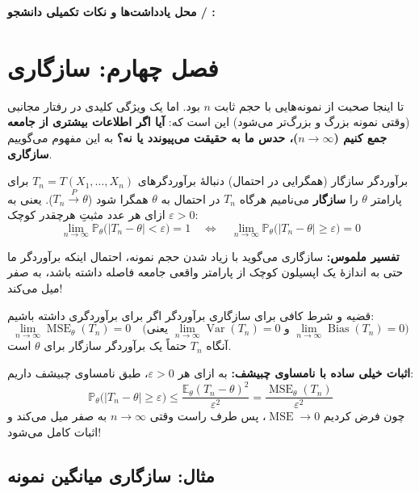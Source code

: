 \documentclass[12pt,a4paper,oneside]{report}
\newcommand{\notespace}{%
  \par\vspace{8pt}%
  \begin{tcolorbox}[breakable=false,colback=white,colframe=muted!50,boxrule=.6pt,arc=1.5mm,height=0.36\textheight]
    \textcolor{muted!70}{\small\textbf{محل یادداشت‌ها و نکات تکمیلی دانشجو / \lr{TA}:}}
  \end{tcolorbox}%
  \par\vspace{8pt}%
}
\newcommand{\E}{\mathbb E}
\newcommand{\Var}{\operatorname{Var}}
\newcommand{\MSE}{\operatorname{MSE}}
\newcommand{\Bias}{\operatorname{Bias}}
\newcommand{\Prob}{\mathbb P}
\begin{document}
\notespace

\clearpage
\chapter*{فصل چهارم: سازگاری }

تا اینجا صحبت از نمونه‌هایی با حجم ثابت $n$ بود. اما یک ویژگی کلیدی در رفتار مجانبی (وقتی نمونه بزرگ و بزرگ‌تر می‌شود) این است که: \textbf{آیا اگر اطلاعات بیشتری از جامعه جمع کنیم ($n \to \infty$)، حدس ما به حقیقت می‌پیوندد یا نه؟} به این مفهوم می‌گوییم \textbf{سازگاری}.

\begin{definition}{برآوردگر سازگار (همگرایی در احتمال)}
دنبالهٔ برآوردگرهای $T_n = T(X_1, \dots, X_n)$ برای پارامتر $\theta$ را \textbf{سازگار } می‌نامیم هرگاه $T_n$ در احتمال به $\theta$ همگرا شود ($T_n \xrightarrow{P} \theta$). یعنی به ازای هر عدد مثبتِ هرچقدر کوچک $\varepsilon > 0$:
\[
\lim_{n \to \infty} \Prob_\theta\big(|T_n - \theta| < \varepsilon\big) = 1 \quad \iff \quad \lim_{n \to \infty} \Prob_\theta\big(|T_n - \theta| \ge \varepsilon\big) = 0
\]
\end{definition}

\textbf{تفسیر ملموس:} سازگاری می‌گوید با زیاد شدن حجم نمونه، احتمال اینکه برآوردگر ما حتی به اندازهٔ یک اپسیلون کوچک از پارامتر واقعی جامعه فاصله داشته باشد، به صفر میل می‌کند!

\begin{result}{قضیه و شرط کافی برای سازگاری برآوردگر}
اگر برای برآوردگری داشته باشیم:
\[
\lim_{n \to \infty} \MSE_\theta(T_n) = 0 \quad \Big(\text{یعنی } \lim_{n\to\infty} \Var(T_n) = 0 \text{ و } \lim_{n\to\infty} \Bias(T_n) = 0 \Big)
\]
آنگاه $T_n$ حتماً یک برآوردگر سازگار برای $\theta$ است.
\end{result}

\textbf{اثبات خیلی ساده با نامساوی چبیشف:}
به ازای هر $\varepsilon > 0$، طبق نامساوی چبیشف داریم:
\[
\Prob_\theta\big(|T_n - \theta| \ge \varepsilon\big) \le \frac{\E_\theta(T_n - \theta)^2}{\varepsilon^2} = \frac{\MSE_\theta(T_n)}{\varepsilon^2}
\]
چون فرض کردیم $\MSE \to 0$، پس طرف راست وقتی $n \to \infty$ به صفر میل می‌کند و اثبات کامل می‌شود!

\section*{مثال: سازگاری میانگین نمونه}
\end{document}
